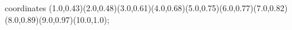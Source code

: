 					coordinates { (1.0,0.43)(2.0,0.48)(3.0,0.61)(4.0,0.68)(5.0,0.75)(6.0,0.77)(7.0,0.82)(8.0,0.89)(9.0,0.97)(10.0,1.0)};